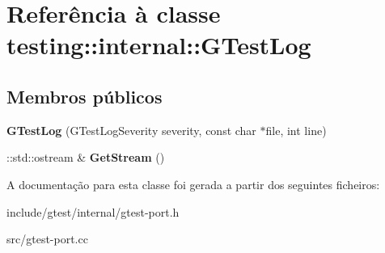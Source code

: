 \hypertarget{classtesting_1_1internal_1_1GTestLog}{\section{Referência à classe testing\-:\-:internal\-:\-:G\-Test\-Log}
\label{classtesting_1_1internal_1_1GTestLog}
}
\subsection*{Membros públicos}
\begin{DoxyCompactItemize}
\item 
\hypertarget{classtesting_1_1internal_1_1GTestLog_a364691bf972983a59cfa2891062a64af}{{\bfseries G\-Test\-Log} (G\-Test\-Log\-Severity severity, const char $\ast$file, int line)}\label{classtesting_1_1internal_1_1GTestLog_a364691bf972983a59cfa2891062a64af}

\item 
\hypertarget{classtesting_1_1internal_1_1GTestLog_aebb92e67d98eca69f0347d5121dab27a}{\-::std\-::ostream \& {\bfseries Get\-Stream} ()}\label{classtesting_1_1internal_1_1GTestLog_aebb92e67d98eca69f0347d5121dab27a}

\end{DoxyCompactItemize}


A documentação para esta classe foi gerada a partir dos seguintes ficheiros\-:\begin{DoxyCompactItemize}
\item 
include/gtest/internal/gtest-\/port.\-h\item 
src/gtest-\/port.\-cc\end{DoxyCompactItemize}
